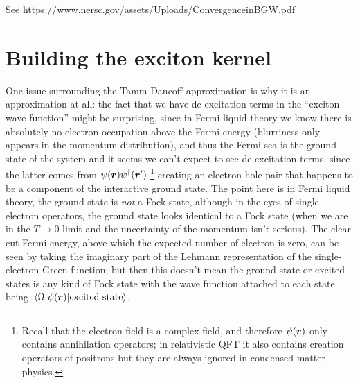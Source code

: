 \documentclass[hyperref, a4paper, 12pt]{report}
\begin{document}
See https://www.nersc.gov/assets/Uploads/ConvergenceinBGW.pdf

\section{Building the exciton kernel}

One issue surrounding the Tamm-Dancoff approximation 
is why it is an approximation at all:
the fact that we have de-excitation terms in the ``exciton wave function'' 
might be surprising, since in Fermi liquid theory 
we know there is absolutely no electron occupation 
above the Fermi energy (blurriness only appears in the momentum distribution), 
and thus the Fermi sea is the ground state of the system 
and it seems we can't expect to see de-excitation terms, 
since the latter comes from $\psi(\vb*{r}) \psi^\dagger(\vb*{r}')$%
\footnote{
    Recall that the electron field is a complex field,
    and therefore $\psi(\vb*{r})$ only contains annihilation operators;
    in relativistic QFT it also contains creation operators of positrons
    but they are always ignored in condensed matter physics.
}
creating an electron-hole pair that 
happens to be a component of the interactive ground state. 
The point here is in Fermi liquid theory, 
the ground state is \emph{not} a Fock state, 
although in the eyes of single-electron operators, 
the ground state looks identical to a Fock state
(when we are in the $T \to 0$ limit 
and the uncertainty of the momentum isn't serious). 
The clear-cut Fermi energy, 
above which the expected number of electron is zero, 
can be seen by taking the imaginary part of the Lehmann representation 
of the single-electron Green function; 
but then this doesn't mean the ground state 
or excited states
is any kind of Fock state with the wave function 
attached to each state being $\mel{\Omega}{\psi(\vb*{r})}{\text{excited state}}$.%
\end{document}
